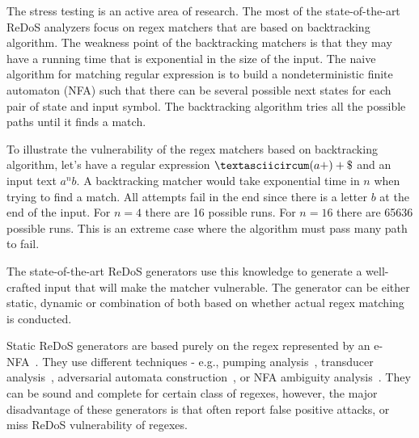 \documentclass[acmsmall,screen]{acmart}
\begin{document}
The stress testing is an active area of research.
%
The most of the state-of-the-art ReDoS analyzers focus on regex matchers that are based on backtracking algorithm.
%
The weakness point of the backtracking
matchers is that they may have a running time that is exponential in the size of the input.
%
The naive algorithm for matching regular expression is to build a nondeterministic finite automaton (NFA) such that there can
be several possible next states for each pair of state and input symbol. 
%
The backtracking algorithm tries all the possible paths until it finds a match.


\begin{example}
To illustrate the vulnerability of the regex matchers based on backtracking algorithm, let's have a regular expression $\textasciicircum(a+)+\$$
and an input text $a^nb$.
%
A backtracking matcher would take exponential time in $n$ when trying to find a match.
%
All attempts fail in the end since there is a letter $b$ at the end of the input.
%
For $n=4$ there are 16 possible runs. 
%
For $n=16$ there are 65636 possible runs. 
%
This is an extreme case where the algorithm must pass many path to fail.
\end{example}

The state-of-the-art ReDoS generators use this knowledge to generate a well-crafted input that will make the matcher vulnerable.
%
The generator can be either static, dynamic or combination of both based on whether actual regex matching is conducted.
%

Static ReDoS generators are based purely on the regex
%
represented by an e-NFA~\cite{staticAna}.
%
They use different techniques - e.g., pumping analysis~\cite{staticAna, staticAna, rxxr2thesis}, 
%
transducer analysis~\cite{Satoshi14},
%
adversarial automata construction~\cite{rexploiter},
%
or NFA ambiguity analysis~\cite{weideman}.
%
They can be sound and complete for certain class of regexes,
however, the major disadvantage of these generators is that 
often report false positive attacks, or miss ReDoS vulnerability
of regexes.
\end{document}
